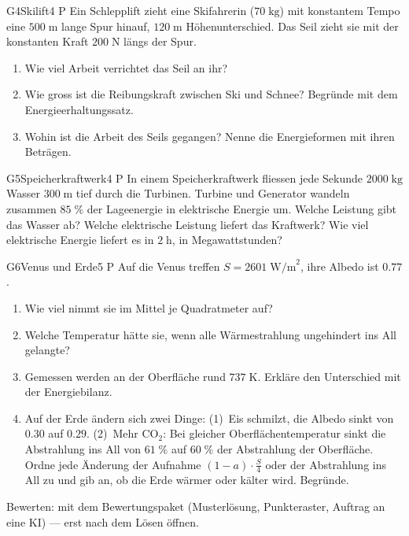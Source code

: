 \documentclass[11pt]{article}
\begin{document}
\begin{lpaufgabe}{G4}{Skilift}{4 P}
Ein Schlepplift zieht eine Skifahrerin (\(70\;\text{kg}\)) mit konstantem Tempo eine \(500\;\text{m}\) lange Spur hinauf, \(120\;\text{m}\) Höhenunterschied. Das Seil zieht sie mit der konstanten Kraft \(200\;\text{N}\) längs der Spur.
\begin{enumerate}[label=\alph*),leftmargin=*,itemsep=2pt,topsep=2pt]
\item Wie viel Arbeit verrichtet das Seil an ihr?
\item Wie gross ist die Reibungskraft zwischen Ski und Schnee? Begründe mit dem Energieerhaltungssatz.
\item Wohin ist die Arbeit des Seils gegangen? Nenne die Energieformen mit ihren Beträgen.
\end{enumerate}
\end{lpaufgabe}


\begin{lpaufgabe}{G5}{Speicherkraftwerk}{4 P}
In einem Speicherkraftwerk fliessen jede Sekunde \(2000\;\text{kg}\) Wasser \(300\;\text{m}\) tief durch die Turbinen. Turbine und Generator wandeln zusammen \(85\;\%\) der Lageenergie in elektrische Energie um.
Welche Leistung gibt das Wasser ab? Welche elektrische Leistung liefert das Kraftwerk? Wie viel elektrische Energie liefert es in \(2\;\text{h}\), in Megawattstunden?
\end{lpaufgabe}


\begin{lpaufgabe}{G6}{Venus und Erde}{5 P}
Auf die Venus treffen \(S = 2601\;\text{W/m}^2\), ihre Albedo ist \(0.77\).
\begin{enumerate}[label=\alph*),leftmargin=*,itemsep=2pt,topsep=2pt]
\item Wie viel nimmt sie im Mittel je Quadratmeter auf?
\item Welche Temperatur hätte sie, wenn alle Wärmestrahlung ungehindert ins All gelangte?
\item Gemessen werden an der Oberfläche rund \(737\;\text{K}\). Erkläre den Unterschied mit der Energiebilanz.
\item Auf der Erde ändern sich zwei Dinge: (1)~Eis schmilzt, die Albedo sinkt von \(0.30\) auf \(0.29\). (2)~Mehr \(\text{CO}_2\): Bei gleicher Oberflächentemperatur sinkt die Abstrahlung ins All von \(61\;\%\) auf \(60\;\%\) der Abstrahlung der Oberfläche.
Ordne jede Änderung der Aufnahme \((1 - a) \cdot \tfrac{S}{4}\) oder der Abstrahlung ins All zu und gib an, ob die Erde wärmer oder kälter wird. Begründe.
\end{enumerate}
\end{lpaufgabe}

\vfill
{\small\color{lpgrau}Bewerten: mit dem Bewertungspaket (Musterlösung, Punkteraster, Auftrag an eine KI) — erst nach dem Lösen öffnen.}
\end{document}
